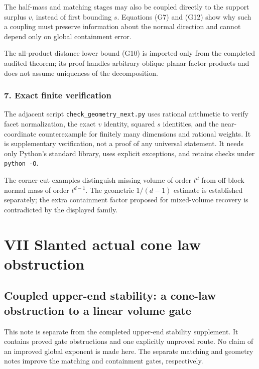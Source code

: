 \documentclass[
  11pt,
]{article}
\begin{document}
The half-mass and matching stages may also be coupled directly to the
support surplus \(v\), instead of first bounding \(s\). Equations (G7)
and (G12) show why such a coupling must preserve information about the
normal direction and cannot depend only on global containment error.

The all-product distance lower bound (G10) is imported only from the
completed audited theorem; its proof handles arbitrary oblique planar
factor products and does not assume uniqueness of the decomposition.

\subsubsection{7. Exact finite
verification}\label{exact-finite-verification}

The adjacent script \texttt{check\_geometry\_next.py} uses rational
arithmetic to verify facet normalization, the exact \(v\) identity,
squared \(s\) identities, and the near-coordinate counterexample for
finitely many dimensions and rational weights. It is supplementary
verification, not a proof of any universal statement. It needs only
Python's standard library, uses explicit exceptions, and retains checks
under \texttt{python\ -O}.

The corner-cut examples distinguish missing volume of order \(t^d\) from
off-block normal mass of order \(t^{d-1}\). The geometric \(1/(d-1)\)
estimate is established separately; the extra containment factor
proposed for mixed-volume recovery is contradicted by the displayed
family.

\newpage

\section{VII Slanted actual cone law
obstruction}\label{vii-slanted-actual-cone-law-obstruction}

\subsection{Coupled upper-end stability: a cone-law obstruction to a
linear volume
gate}\label{coupled-upper-end-stability-a-cone-law-obstruction-to-a-linear-volume-gate}

This note is separate from the completed upper-end stability supplement.
It contains proved gate obstructions and one explicitly unproved route.
No claim of an improved global exponent is made here. The separate
matching and geometry notes improve the matching and containment gates,
respectively.
\end{document}
